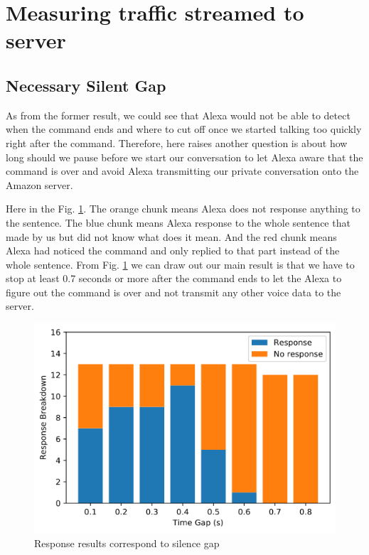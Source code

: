 \section{Measuring traffic streamed to server}

\subsection{Necessary Silent Gap}

As from the former result, we could see that Alexa would not be able to detect when the command ends and where to cut off once we started talking too quickly right after the command. Therefore, here raises another question is about how long should we pause before we start our conversation to let Alexa aware that the command is over and avoid Alexa transmitting our private conversation onto the Amazon server.

Here in the Fig. \ref{fig:gap}. The orange chunk means Alexa does not response anything to the sentence. The blue chunk means Alexa response to the whole sentence that made by us but did not know what does it mean. And the red chunk means Alexa had noticed the command and only replied to that part instead of the whole sentence. From Fig. \ref{fig:gap} we can draw out our main result is that we have to stop at least 0.7 seconds or more after the command ends to let the Alexa to figure out the command is over and not transmit any other voice data to the server.

\begin{figure}[ht]
	\centering
	\includegraphics[scale=0.4]{response_breakdown}
	\caption{Response results correspond to silence gap}
	\label{fig:gap}
	\vspace{-3mm}
	\end{figure}

